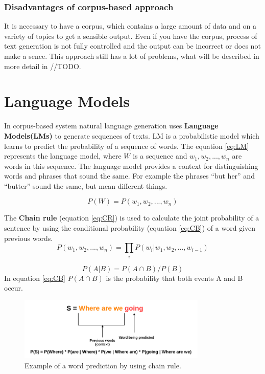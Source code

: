 \subsubsection{Disadvantages of corpus-based approach}
It is necessary to have a corpus, which contains a large amount of data and on a variety of topics to get a sensible output. Even if you have the corpus, process of text generation is not fully controlled and the output can be incorrect or does not make a sence. This approach still has a lot of problems, what will be described in more detail in //TODO. 

\section{Language Models}
In corpus-based system natural language generation uses \textbf{Language Models(LMs)} to generate sequences of texts. LM is a probabilistic model which learns to predict the probability of a sequence of words. The equation \ref{eq:LM} represents the language model, where $W$ is a sequence and $w_1, w_2, ..., w_n$ are words in this sequence. The language model provides a context for distinguishing words and phrases that sound the same. For example the phrases ``but her'' and  ``butter'' sound the same, but mean different things.

\begin{equation} \label{eq:LM}
P(W) = P(w_1, w_2, ..., w_n)
\end{equation}

The \textbf{Chain rule} (equation \ref{eq:CR}) is used to calculate the joint probability of a sentence by using the conditional probability (equation \ref{eq:CB}) of a word given previous words. 
\begin{equation} \label{eq:CR}
P(w_1, w_2,..., w_n) = \prod_{i}P(w_i|w_1, w_2,...,w_{i-1})
\end{equation}

\begin{equation} \label{eq:CB}
P(A|B) = P(A \cap B) / P(B)
\end{equation}
In equation \ref{eq:CB} $P(A \cap B)$ is the probability that both events A and B occur.

\begin{figure}[hbt]
  \centering
  \includegraphics[width=0.8\textwidth]{figures/lm.png}
  \caption{Example of a word prediction by using chain rule.}
  \label{chain_rule}
\end{figure}

